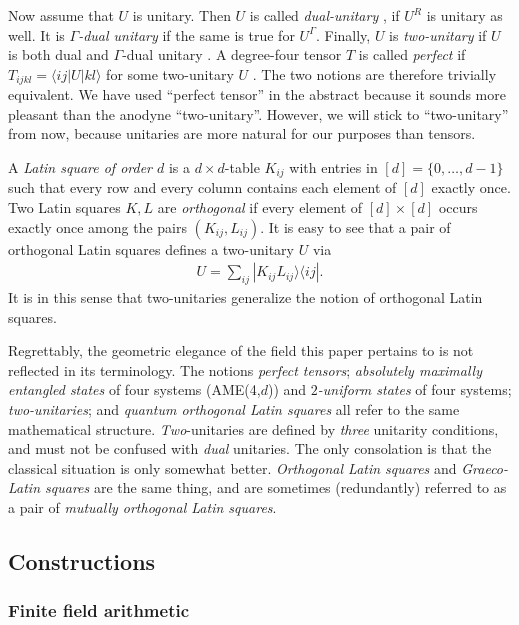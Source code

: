 \documentclass[aps,nofootinbib,floatfix,a4paper]{revtex4}
\newcommand{\1}{\mbox{$\mathbf{1}$}}
\begin{document}
Now assume that $U$ is unitary.
Then $U$ is called \emph{dual-unitary} \cite{Bertini2019Exact}, if $U^R$ is unitary as well.
It is
\emph{$\Gamma$-dual unitary} 
\cite{Rather2021From}
if the same is true for $U^\Gamma$.
Finally, $U$ is
\emph{two-unitary} if $U$ is both dual and $\Gamma$-dual unitary 
\cite{Goyeneche2015Absolutely}.
A degree-four tensor $T$ is called \emph{perfect} if $T_{ijkl}=\langle i j|U|kl\rangle$ for some two-unitary $U$
\cite{pastawski2015holographic}.
The two notions are therefore trivially equivalent.
We have used ``perfect tensor'' in the abstract because it sounds more pleasant than the anodyne ``two-unitary''.
However, we will stick to ``two-unitary'' from now, because unitaries are more natural for our purposes than tensors.


A \emph{Latin square of order $d$} is 
a $d\times d$-table $K_{ij}$ with entries in $[d]=\{0, \dots, d-1\}$ such that every row and every column contains each element of $[d]$ exactly once.
Two Latin squares $K, L$ are \emph{orthogonal} if every element of $[d]\times [d]$ occurs exactly once among the pairs $(K_{ij}, L_{ij})$. %
It is easy to see  %
that a pair of orthogonal Latin squares defines a two-unitary $U$ via
\begin{align}\label{eqn:ols_to_unitary}
	U = \sum_{ij} |K_{ij} L_{ij}\rangle\langle ij|.
\end{align}
It is in this sense that two-unitaries generalize the notion of orthogonal Latin squares. 


Regrettably, the geometric elegance of the field this paper pertains to is not reflected in its terminology.
The notions \emph{perfect tensors};
\emph{absolutely maximally entangled states}
of four systems (AME(4,$d$))
and 
\emph{$2$-uniform states} of four systems;
\emph{two-unitaries};
and
\emph{quantum orthogonal Latin squares}
all refer to the same mathematical structure.
\emph{Two}-unitaries
are defined by \emph{three} unitarity conditions, and must not be confused with \emph{dual} unitaries.
The only consolation is that the classical situation is only somewhat better.
\emph{Orthogonal Latin squares} and
\emph{Graeco-Latin squares} are the same thing,
and are sometimes (redundantly) referred to as a pair of \emph{mutually orthogonal Latin squares}.


\subsection{Constructions}

\subsubsection{Finite field arithmetic}
\end{document}
